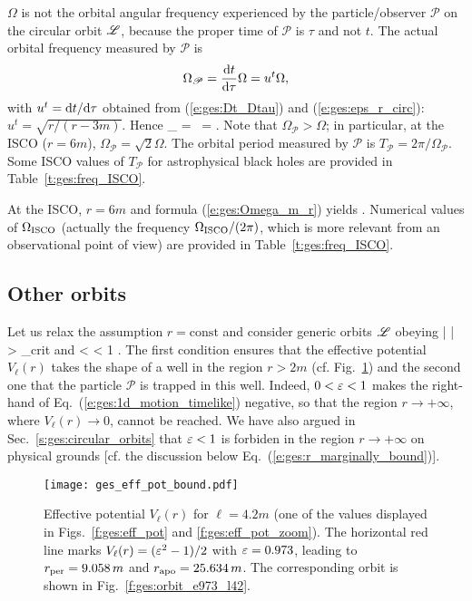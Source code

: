 \begin{remark}
$\Omega$ is not the orbital angular frequency experienced by the particle/observer
$\mathscr{P}$ on the circular orbit $\mathscr{L}$, because the proper time of $\mathscr{P}$ is
$\tau$ and not $t$. The actual orbital frequency measured by $\mathscr{P}$
is
\[
    \Omega_{\mathscr{P}} = \frac{\mathrm{d} t}{\mathrm{d} \tau} \Omega = u^t \Omega ,
\]
with $u^t = \mathrm{d} t/\mathrm{d}\tau$ obtained from (\ref{e:ges:Dt_Dtau}) and
(\ref{e:ges:eps_r_circ}): $u^t = \sqrt{r/(r-3m)}$. Hence
\be
    \Omega_{} = \, \Omega  =
        .
\ee
Note that $\Omega_{\mathscr{P}} > \Omega$; in particular, at the ISCO ($r=6m$),
$\Omega_{\mathscr{P}} = \sqrt{2} \Omega$. The orbital period measured by $\mathscr{P}$
is $T_{\mathscr{P}} = 2\pi/\Omega_{\mathscr{P}}$. Some ISCO values of $T_{\mathscr{P}}$
for astrophysical black holes are provided in Table~\ref{t:ges:freq_ISCO}.
\end{remark}


At the ISCO, $r=6m$ and formula (\ref{e:ges:Omega_m_r}) yields
\be
     .
\ee
Numerical values of $\Omega_{\rm ISCO}$ (actually the frequency $\Omega_{\rm ISCO}/(2\pi)$,
which is more relevant from an observational point of view) are provided in
Table~\ref{t:ges:freq_ISCO}.

\subsection{Other orbits}

Let us relax the assumption $r=\mathrm{const}$ and consider generic orbits $\mathscr{L}$
obeying
\be
    | \ell | > \ell_{\rm crit} \qquad\mbox{and} < \veps < 1 .
\ee
The first condition ensures that the effective potential $V_{\ell}(r)$
takes the shape of a well in the region $r>2m$ (cf. Fig.~\ref{f:ges:eff_pot_bound})
and the second one that the particle $\mathscr{P}$ is trapped in this well.
Indeed, $0 < \varepsilon < 1$  makes the right-hand of Eq.~(\ref{e:ges:1d_motion_timelike}) negative, so
that the region $r\to +\infty$, where $V_{\ell}(r)\to 0$,
cannot be reached. We have also argued in Sec.~\ref{s:ges:circular_orbits}
that $\varepsilon < 1$ is forbiden in the region $r\to +\infty$ on physical
grounds [cf. the discussion below Eq.~(\ref{e:ges:r_marginally_bound})].

\begin{figure}
\centerline{\texttt{[image: ges\_eff\_pot\_bound.pdf]}}
\caption[]{\label{f:ges:eff_pot_bound} \footnotesize
Effective potential $V_{\ell}(r)$ for $\ell = 4.2 m$ (one of the values displayed
in Figs.~\ref{f:ges:eff_pot}  and \ref{f:ges:eff_pot_zoom}).
The horizontal red line marks $V_{\ell}(r) = (\varepsilon^2-1)/2$
with $\varepsilon = 0.973$, leading to $r_{\rm per} = 9.058\, m$ and $r_{\rm apo} = 25.634\, m$.
The corresponding orbit is shown in Fig.~\ref{f:ges:orbit_e973_l42}.
}
\end{figure}


